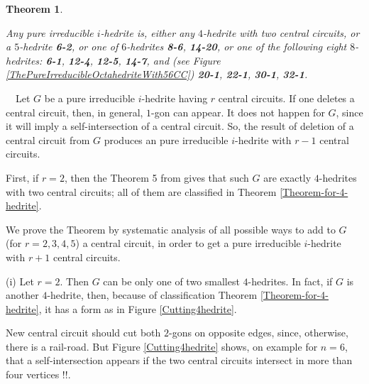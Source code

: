 \documentclass[12pt]{article}
\newtheorem{theorem}{Theorem}
\newcommand{\proof}{\noindent{\bf Proof.}\ \ }
\begin{document}
%







\begin{theorem}\label{TheOneWithSimpleCentralCircuit}

Any pure irreducible $i$-hedrite is, either any $4$-hedrite with two
central circuits, or a $5$-hedrite {\bf 6-2}, or one of $6$-hedrites
{\bf 8-6}, {\bf 14-20}, or one of the following eight $8$-hedrites:
{\bf 6-1}, {\bf 12-4}, {\bf 12-5}, {\bf 14-7}, and (see Figure 
\ref{ThePureIrreducibleOctahedriteWith56CC}) {\bf 20-1}, {\bf 22-1},
{\bf 30-1}, {\bf 32-1}.


\end{theorem}


\proof Let $G$ be a pure irreducible $i$-hedrite having $r$ central circuits. 
If one deletes a central circuit, then, in general, $1$-gon can appear. It 
does not happen for $G$, since it will imply a self-intersection of a central 
circuit. So, the result of deletion of a central circuit from $G$ 
produces an pure irreducible $i$-hedrite with $r-1$ central circuits.

First, if $r=2$, then the Theorem 5 from \cite{DSt} gives that such $G$ are 
exactly $4$-hedrites with two central circuits; all of them are classified 
in Theorem \ref{Theorem-for-4-hedrite}.

We prove the Theorem by systematic analysis of all possible ways to add 
to $G$ (for $r=2,3,4,5$) a central circuit, in order to get a pure 
irreducible $i$-hedrite with $r+1$ central circuits. 


(i) Let $r=2$. Then $G$ can be only one of two smallest $4$-hedrites. In 
fact, if $G$ is another $4$-hedrite, then, because of classification Theorem 
\ref{Theorem-for-4-hedrite}, it has a form as in Figure \ref{Cutting4hedrite}.

New central circuit should cut both $2$-gons on opposite edges, since, otherwise, there is a rail-road. But Figure \ref{Cutting4hedrite} shows, on example for $n=6$, that a self-intersection appears if the two central circuits intersect in more than four vertices !!.
\end{document}

